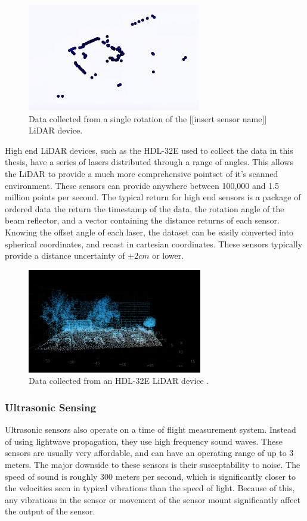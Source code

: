 \documentclass[12pt]{drexelthesis}
\let\Oldsubsubsection\subsubsection
\renewcommand{\subsubsection}{\FloatBarrier\Oldsubsubsection}
\begin{document}
\begin{figure}[!ht]
	\centering
		\includegraphics{instruments/crummy_lidar.jpg}
	\caption[Single frame of low tier LiDAR sensor data collection]{\centering Data collected from a single rotation of the [[insert sensor name]] LiDAR device.}
\end{figure}

High end LiDAR devices, such as the HDL-32E used to collect the data in this thesis, have a series of lasers distributed through a range of angles. This allows the LiDAR to provide a much more comprehensive pointset of it's scanned environment. These sensors can provide anywhere between 100,000 and 1.5 million points per second. The typical return for high end sensors is a package of ordered data the return the timestamp of the data, the rotation angle of the beam reflector, and a vector containing the distance returns of each sensor. Knowing the offset angle of each laser, the dataset can be easily converted into spherical coordinates, and recast in cartesian coordinates. These sensors typically provide a distance uncertainty of $\pm 2 cm$ or lower.

\begin{figure}[!ht]
	\centering
		\includegraphics[width=3in]{instruments/HDL-32eClean.png}
	\caption[Example of a high tier LiDAR sensor data output]{\centering Data collected from an HDL-32E LiDAR device \cite{velodyne}. } %
\end{figure}


\subsubsection{Ultrasonic Sensing}
Ultrasonic sensors also operate on a time of flight measurement system. Instead of using lightwave propagation, they use high frequency sound waves. These sensors are usually very affordable, and can have an operating range of up to 3 meters. The major downside to these sensors is their susceptability to noise. The speed of sound is roughly 300 meters per second, which is significantly closer to the velocities seen in typical vibrations than the speed of light. Because of this, any vibrations in the sensor or movement of the sensor mount significantly affect the output of the sensor.
\end{document}
